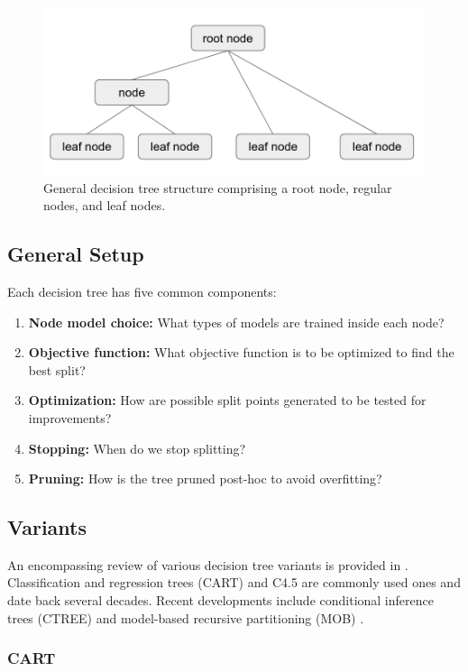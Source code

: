 \documentclass[a4paper, 11pt]{article}
\begin{document}
\begin{figure}
    \centering
    \includegraphics[width = 0.5 \linewidth]{thesis/figure/tree_structure.png}
    \caption{General decision tree structure comprising a root node, regular nodes, and leaf nodes.}
    \label{fig:tree_structure}
\end{figure}

\subsection{General Setup}

Each decision tree has five common components:
\begin{enumerate}
    \item \textbf{Node model choice:} What types of models are trained inside each node?
    \item \textbf{Objective function:} What objective function is to be optimized to find the best split?
    \item \textbf{Optimization:} How are possible split points generated to be tested for improvements?
    \item \textbf{Stopping:} When do we stop splitting?
    \item \textbf{Pruning:} How is the tree pruned post-hoc to avoid overfitting?
\end{enumerate}

\subsection{Variants}

An encompassing review of various decision tree variants is provided in \cite{loh_trees_review}. 
Classification and regression trees (CART) \cite{cart_1, cart_2, cart_3} and C4.5 \cite{quinlan_c45} are commonly used ones \cite{hastie_elemstatlearn} and date back several decades. Recent developments include conditional inference trees (CTREE) \cite{hothorn_ctree} and model-based recursive partitioning (MOB) \cite{zeileis_mob}.

\subsubsection{CART}
\end{document}
